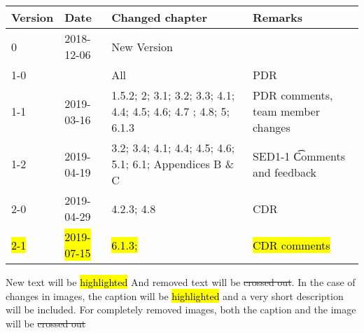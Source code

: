 \begin{longtable}{|p{1.5cm}|p{2cm}|p{6cm}|p{3cm}|}\hline
\centering
\textbf{Version} & \textbf{Date} & \textbf{Changed chapter} & \textbf{Remarks}  \\\hline
0       & 2018-12-06        & New Version                                                           &                                       \\\hline
1-0     &                   & All                                                                   & PDR                                   \\\hline
1-1     & 2019-03-16        & 1.5.2; 2; 3.1; 3.2; 3.3; 4.1; 4.4; 4.5; 4.6; 4.7 ; 4.8; 5; 6.1.3      & PDR comments, team member changes     \\\hline
1-2     & 2019-04-19        & 3.2; 3.4; 4.1; 4.4; 4.5; 4.6; 5.1; 6.1; Appendices B \& C             & SED1-1 \t Comments and feedback       \\\hline
2-0     & 2019-04-29        & 4.2.3; 4.8                                                            & CDR                                   \\\hline
\hl{2-1}& \hl{2019-07-15}   & \hl{6.1.3; }                                                          & \hl{CDR comments}                     \\\hline

\end{longtable}       

New text will be \hl{highlighted} And removed text will be \st{crossed out}. In the case of changes in images, the caption will be \hl{highlighted} and a very short description will be included. For completely removed images, both the caption and the image will be \st{crossed out} 